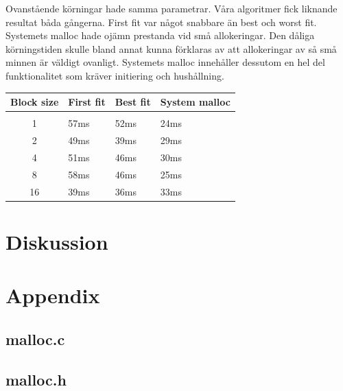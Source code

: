 \documentclass[paper=a4, fontsize=11pt]{scrartcl} %
\numberwithin{equation}{section} %
\numberwithin{figure}{section} %
\numberwithin{table}{section} %
\begin{document}
Ovanstående körningar hade samma parametrar. Våra algoritmer fick liknande resultat båda gångerna. First fit var något snabbare än best och worst fit. Systemets malloc hade ojämn prestanda vid små allokeringar. 
Den dåliga körningstiden skulle bland annat kunna förklaras av att allokeringar av så små minnen är väldigt ovanligt. Systemets malloc innehåller dessutom en hel del funktionalitet som kräver initiering och hushållning.



\begin{table}[h!] %
\begin{tabular}{ c l l l}
   Block size & First fit & Best fit & System malloc \\
  \hline \\
  1 & 57ms & 52ms & 24ms \\
  2 & 49ms & 39ms & 29ms \\
  4 & 51ms & 46ms & 30ms \\
  8 & 58ms & 46ms & 25ms \\
  16 & 39ms & 36ms & 33ms \\
\end{tabular}
\end{table}


\section{Diskussion}


\newpage
\section*{Appendix}
\subsection*{malloc.c}


\newpage
\subsection*{malloc.h}

\end{document}
